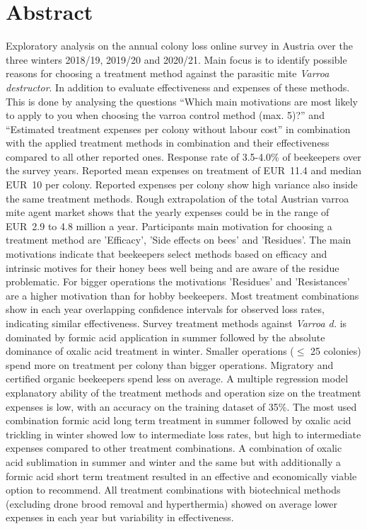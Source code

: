 \chapter*{Abstract}
\label{sec:abstract}
\vspace*{-15mm}

Exploratory analysis on the annual colony loss online survey in Austria over the three winters 2018/19, 2019/20 and 2020/21. Main focus is to identify possible reasons for choosing a treatment method against the parasitic mite \textit{Varroa destructor}. In addition to evaluate effectiveness and expenses of these methods. This is done by analysing the questions \enquote{Which main motivations are most likely to apply to you when choosing the varroa control method (max. 5)?} and \enquote{Estimated treatment expenses per colony without labour cost} in combination with the applied treatment methods in combination and their effectiveness compared to all other reported ones. Response rate of 3.5-4.0\% of beekeepers over the survey years. Reported mean expenses on treatment of EUR~11.4 and median EUR~10 per colony. Reported expenses per colony show high variance also inside the same treatment methods. Rough extrapolation of the total Austrian varroa mite agent market shows that the yearly expenses could be in the range of EUR~2.9 to 4.8 million a year. Participants main motivation for choosing a treatment method are 'Efficacy', 'Side effects on bees' and 'Residues'. The main motivations indicate that beekeepers select methods based on efficacy and intrinsic motives for their honey bees well being and are aware of the residue problematic. For bigger operations the motivations 'Residues' and 'Resistances' are a higher motivation than for hobby beekeepers. Most treatment combinations show in each year overlapping confidence intervals for observed loss rates, indicating similar effectiveness. Survey treatment methods against \textit{Varroa d.} is dominated by formic acid application in summer followed by the absolute dominance of oxalic acid treatment in winter. Smaller operations ($\leq$ 25 colonies) spend more on treatment per colony than bigger operations. Migratory and certified organic beekeepers spend less on average. A multiple regression model explanatory ability of the treatment methods and operation size on the treatment expenses is low, with an accuracy on the training dataset of 35\%. The most used combination formic acid long term treatment in summer followed by oxalic acid trickling in winter showed low to intermediate loss rates, but high to intermediate expenses compared to other treatment combinations. A combination of oxalic acid sublimation in summer and winter and the same but with additionally a formic acid short term treatment resulted in an effective and economically viable option to recommend. All treatment combinations with biotechnical methods (excluding drone brood removal and hyperthermia) showed on average lower expenses in each year but variability in effectiveness.
